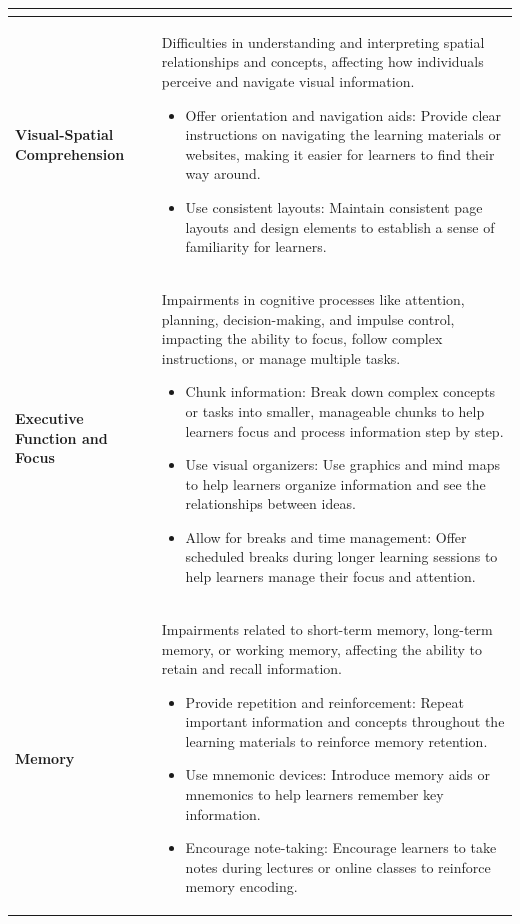 \documentclass[main.tex]{subfiles}
\begin{document}
\begin{longtable}{p{4cm}p{10cm}}
\begin{itemize}
    \end{itemize} \\
    \midrule
    \textbf{Visual-Spatial Comprehension} & Difficulties in understanding and interpreting spatial relationships and concepts, affecting how individuals perceive and navigate visual information.
    \begin{itemize}
        \item Offer orientation and navigation aids: Provide clear instructions on navigating the learning materials or websites, making it easier for learners to find their way around.
        \item Use consistent layouts: Maintain consistent page layouts and design elements to establish a sense of familiarity for learners.
    \end{itemize} \\
    \midrule
    \textbf{Executive Function and Focus} & Impairments in cognitive processes like attention, planning, decision-making, and impulse control, impacting the ability to focus, follow complex instructions, or manage multiple tasks.
    \begin{itemize}
        \item Chunk information: Break down complex concepts or tasks into smaller, manageable chunks to help learners focus and process information step by step.
        \item Use visual organizers: Use graphics and mind maps to help learners organize information and see the relationships between ideas.
        \item Allow for breaks and time management: Offer scheduled breaks during longer learning sessions to help learners manage their focus and attention.
    \end{itemize} \\
    \midrule
    \textbf{Memory} & Impairments related to short-term memory, long-term memory, or working memory, affecting the ability to retain and recall information.
    \begin{itemize}
        \item Provide repetition and reinforcement: Repeat important information and concepts throughout the learning materials to reinforce memory retention.
        \item Use mnemonic devices: Introduce memory aids or mnemonics to help learners remember key information.
        \item Encourage note-taking: Encourage learners to take notes during lectures or online classes to reinforce memory encoding.
    \end{itemize} \\
    \bottomrule
\end{longtable}
\end{document}
